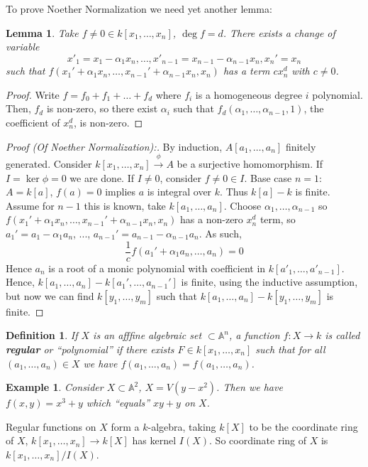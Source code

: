 \documentclass[12pt]{article}
\newcommand{\A}{\mathbb{A}}
\newtheorem{definition}{Definition}[section]
\newtheorem*{example}{Example}
\newtheorem{lemma}{Lemma}[section]
\begin{document}
    To prove Noether Normalization we need yet another lemma:
    \begin{lemma}
        Take $f \neq 0 \in k[x_1, \dots, x_n]$, $\deg f = d$. There exists a change of variable
         $$x'_1 = x_1 - \alpha_1 x_n, \dots, x'_{n-1} = x_{n-1} - \alpha_{n-1}x_n, x_n' = x_n$$
        such that $f(x_1' + \alpha_1x_n, \dots, x_{n-1}'+\alpha_{n-1}x_n, x_n)$ has a term $cx^d_n$ with $c \neq 0$.  
    \end{lemma}
    \begin{proof}
        Write $f = f_0 + f_1 + \dots + f_d$ where $f_i$ is a homogeneous degree $i$ polynomial. Then, $f_d$ is non-zero, so there exist $\alpha_i$ such that $f_d(\alpha_1, \dots, \alpha_{n-1}, 1)$, the coefficient of $x^d_n$, is non-zero.  
    \end{proof}
    \begin{proof}
        [Proof (Of Noether Normalization):] By induction, $A[a_1, \dots, a_n]$ finitely generated. Consider $k[x_1, \dots, x_n] \xrightarrow{\phi} A$ be a surjective homomorphism. If $I = \ker \phi = 0$ we are done. If $I \neq 0$, consider $f \neq 0 \in I$. Base case $n=1$: $A = k[a]$, $f(a) = 0$ implies $a$ is integral over $k$. Thus $k[a] - k$ is finite. Assume for $n-1$ this is known, take $k[a_1, \dots, a_n]$. Choose $\alpha_1, \dots, \alpha_{n-1}$ so $f(x_1' + \alpha_1x_n, \dots, x_{n-1}'+\alpha_{n-1}x_n, x_n)$ has a non-zero $x_n^d$ term, so $a_1' = a_1 - \alpha_1a_n$, ..., $a_{n-1}' = a_{n-1} - \alpha_{n-1}a_n$. As such, 
        $$\frac{1}{c}f(a_1' + \alpha_1a_n, \dots, a_n) = 0$$
        Hence $a_n$ is a root of a monic polynomial with coefficient in $k[a'_1, \dots, a'_{n-1}]$. Hence, $k[a_1, \dots, a_n] - k[a_1', \dots, a_{n-1}']$ is finite, using the inductive assumption, but now we can find $k[y_1, \dots, y_m]$ such that $k[a_1, \dots, a_n] - k[y_1, \dots, y_m]$ is finite. 
    \end{proof}
    \begin{definition}
        If $X$ is an afffine algebraic set $\subset \A^n$, a function $f: X \to k$ is called \textbf{regular} or ``polynomial'' if there exists $F \in k[x_1, \dots, x_n]$ such that for all $(a_1, \dots, a_n) \in X$ we have $f(a_1, \dots, a_n) = f(a_1, \dots, a_n)$.  
    \end{definition}
    \begin{example}
        Consider $X \subset \A^2$, $X = V(y-x^2)$. Then we have $f(x, y) = x^3 + y$ which ``equals'' $xy + y$ on $X$. 
    \end{example}
    Regular functions on $X$ form a $k$-algebra, taking $k[X]$ to be the coordinate ring of $X$, $k[x_1, \dots, x_n] \to k[X]$ has kernel $I(X)$. So coordinate ring of $X$ is $k[x_1, \dots, x_n]/I(X)$. 
\end{document}
